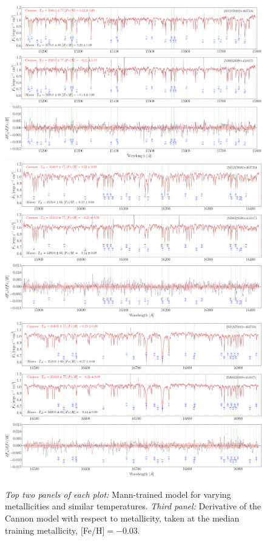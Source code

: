 \documentclass[preprint]{aastex62}
\begin{document}
\begin{figure}[ht]
\begin{center}
\includegraphics[width=16cm]{figures/demo_derivatives_feh1.png}
\includegraphics[width=16cm]{figures/demo_derivatives_feh2.png}
\includegraphics[width=16cm]{figures/demo_derivatives_feh3.png}
\end{center}
\caption{\textit{Top two panels of each plot:} Mann-trained model for varying metallicities and similar temperatures. \textit{Third panel:} Derivative of the Cannon model with respect to metallicity, taken at the median training metallicity, [Fe/H]$=-0.03$.} \label{fig:demo_feh}
\end{figure}
\end{document}

